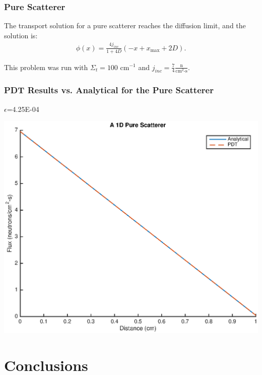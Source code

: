 \documentclass[]{beamer}
\begin{document}
\begin{frame}[t]\frametitle{Pure Scatterer}
\begin{block}{}
The transport solution for a pure scatterer reaches the diffusion limit, and the solution is:
\begin{align*}
\phi(x) = \frac{4j_{inc}}{1+4D}(-x + x_{\text{max}} + 2D).
\end{align*}
\end{block}
\begin{block}{}
This problem was run with $\Sigma_t = 100 \text{ cm}^{-1}$ and $j_{inc} = \frac{7}{4} \frac{\text{n}}{\text{cm}^2\text{-s}}$. 
\end{block}
\end{frame}

\begin{frame}[t]\frametitle{PDT Results vs. Analytical for the Pure Scatterer}
\begin{minipage}{0.2\textwidth}
\begin{footnotesize}
$\epsilon$=4.25E-04
\end{footnotesize}
\end{minipage}
\begin{minipage}{0.75\textwidth}
\centering
\includegraphics[scale = 0.5]{figures/PureScatterer.eps}
\end{minipage}

\end{frame}

\section{Conclusions}
\end{document}
